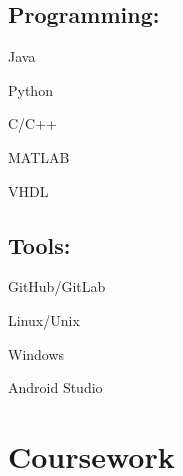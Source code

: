 \documentclass[]{hieudo-build}
\begin{document}
\begin{minipage}[t]{0.34\textwidth}
\subsection{Programming:}
\vspace{0.7em} %
\begin{tightemize}
\scriptsize{}
  \item Java 
  \item Python
  \item C/C++
  \item MATLAB
  \item VHDL
\end{tightemize}




\subsection{Tools:}
\vspace{0.7em} %
\begin{tightemize}
\setlength{\itemsep}{0pt}
\scriptsize{}
  \item GitHub/GitLab 
  \item Linux/Unix
  \item Windows
  \item Android Studio
\end{tightemize}



\section{Coursework}

\end{minipage}
\end{document}
